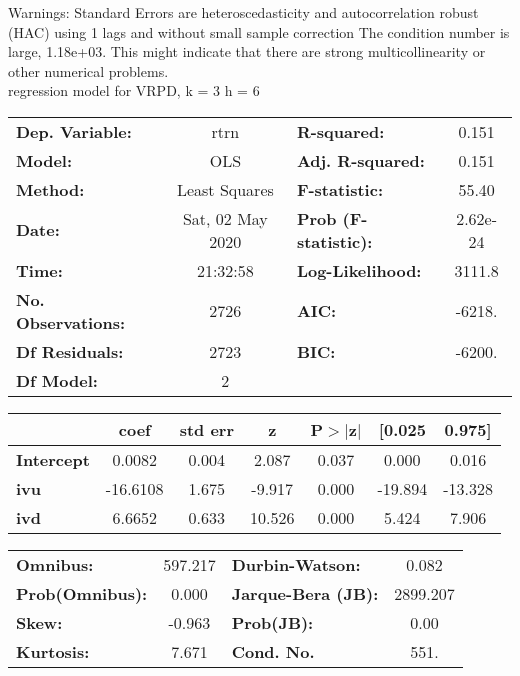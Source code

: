 Warnings: \newline
 [1] Standard Errors are heteroscedasticity and autocorrelation robust (HAC) using 1 lags and without small sample correction \newline
 [2] The condition number is large, 1.18e+03. This might indicate that there are \newline
 strong multicollinearity or other numerical problems.\\ 

regression model for VRPD, k = 3 h = 6\begin{center}
\begin{tabular}{lclc}
\toprule
\textbf{Dep. Variable:}    &       rtrn       & \textbf{  R-squared:         } &     0.151   \\
\textbf{Model:}            &       OLS        & \textbf{  Adj. R-squared:    } &     0.151   \\
\textbf{Method:}           &  Least Squares   & \textbf{  F-statistic:       } &     55.40   \\
\textbf{Date:}             & Sat, 02 May 2020 & \textbf{  Prob (F-statistic):} &  2.62e-24   \\
\textbf{Time:}             &     21:32:58     & \textbf{  Log-Likelihood:    } &    3111.8   \\
\textbf{No. Observations:} &        2726      & \textbf{  AIC:               } &    -6218.   \\
\textbf{Df Residuals:}     &        2723      & \textbf{  BIC:               } &    -6200.   \\
\textbf{Df Model:}         &           2      & \textbf{                     } &             \\
\bottomrule
\end{tabular}
\begin{tabular}{lcccccc}
                   & \textbf{coef} & \textbf{std err} & \textbf{z} & \textbf{P$> |$z$|$} & \textbf{[0.025} & \textbf{0.975]}  \\
\midrule
\textbf{Intercept} &       0.0082  &        0.004     &     2.087  &         0.037        &        0.000    &        0.016     \\
\textbf{ivu}       &     -16.6108  &        1.675     &    -9.917  &         0.000        &      -19.894    &      -13.328     \\
\textbf{ivd}       &       6.6652  &        0.633     &    10.526  &         0.000        &        5.424    &        7.906     \\
\bottomrule
\end{tabular}
\begin{tabular}{lclc}
\textbf{Omnibus:}       & 597.217 & \textbf{  Durbin-Watson:     } &    0.082  \\
\textbf{Prob(Omnibus):} &   0.000 & \textbf{  Jarque-Bera (JB):  } & 2899.207  \\
\textbf{Skew:}          &  -0.963 & \textbf{  Prob(JB):          } &     0.00  \\
\textbf{Kurtosis:}      &   7.671 & \textbf{  Cond. No.          } &     551.  \\
\bottomrule
\end{tabular}
\end{center}

